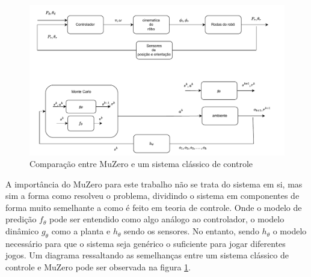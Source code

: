 \begin{figure}[H]
    \label{fig:comparacao:muzero:sistema:classico}
    \centering
    \includegraphics[scale=0.6]{figuras/muzero_controle_cinematico.pdf}
    \caption{Comparação entre MuZero e um sistema clássico de controle}
\end{figure}

A importância do MuZero para este trabalho não se trata do sistema em si,
mas sim a forma como resolveu o problema, dividindo o sistema em componentes
de forma muito semelhante a como é feito em teoria de controle. Onde
o modelo de predição  $f_{\theta}$ pode ser entendido como algo
análogo ao controlador, o  modelo dinâmico $g_{\theta}$ como a planta
e $h_{\theta}$ sendo os sensores. No entanto, sendo $h_{\theta}$ o modelo
necessário  para que o sistema seja genérico o suficiente para jogar
diferentes jogos. Um diagrama ressaltando as semelhanças entre um sistema
clássico de controle e MuZero pode ser observada na figura \ref{fig:comparacao:muzero:sistema:classico}.

